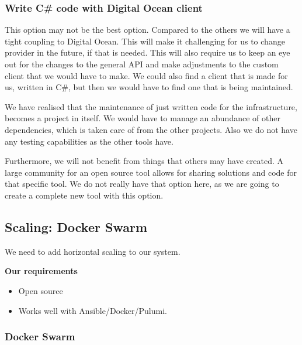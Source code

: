 \subsubsection{Write C\# code with Digital Ocean client}

This option may not be the best option. Compared to the others we will have a tight coupling to Digital Ocean. This will make it challenging for us to change provider in the future, if that is needed. This will also require us to keep an eye out for the changes to the general API and make adjustments to the custom client that we would have to make. We could also find a client that is made for us, written in C\#, but then we would have to find one that is being maintained.

We have realised that the maintenance of just written code for the infrastructure, becomes a project in itself. We would have to manage an abundance of other dependencies, which is taken care of from the other projects. Also we do not have any testing capabilities as the other tools have.

Furthermore, we will not benefit from things that others may have created. A large community for an open source tool allows for sharing solutions and code for that specific tool. We do not really have that option here, as we are going to create a complete new tool with this option.

\subsection{Scaling: Docker Swarm}

We need to add horizontal scaling to our system.

\textbf{Our requirements}

\begin{itemize}
    \item Open source
    \item Works well with Ansible/Docker/Pulumi.
\end{itemize}

\subsubsection{Docker Swarm}

